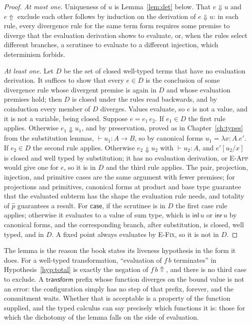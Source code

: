 \documentclass[11pt,openany]{book}
\theoremstyle{remark}
\begin{document}
\begin{proof}
\emph{At most one.} Uniqueness of $u$ is Lemma~\ref{lem:det} below. That
$e\Downarrow u$ and $e\Uparrow$ exclude each other follows by induction on
the derivation of $e\Downarrow u$: in each rule, every divergence rule for
the same term form requires some premise to diverge that the evaluation
derivation shows to evaluate, or, when the rules select different
branches, a scrutinee to evaluate to a different injection, which
determinism forbids.

\emph{At least one.} Let $D$ be the set of closed well-typed terms that
have no evaluation derivation. It suffices to show that every $e\in D$ is
the conclusion of some divergence rule whose divergent premise is again in
$D$ and whose evaluation premises hold; then $D$ is closed under the rules
read backwards, and by coinduction every member of $D$ diverges. Values
evaluate, so $e$ is not a value, and it is not a variable, being closed.
Suppose $e=e_1\,e_2$. If $e_1\in D$ the first rule applies. Otherwise
$e_1\Downarrow u_1$, and by preservation, proved as in
Chapter~\ref{ch:types} from the substitution lemmas, $\vdash u_1:A\to B$,
so by canonical forms $u_1=\lambda x{:}A.e'$. If $e_2\in D$ the second
rule applies. Otherwise $e_2\Downarrow u_2$ with $\vdash u_2:A$, and
$e'[u_2/x]$ is closed and well typed by substitution; it has no evaluation
derivation, or \textsc{E-App} would give one for $e$, so it is in $D$ and
the third rule applies. The pair, projection, injection, and primitive
cases are the same argument with fewer premises; for projections and
primitives, canonical forms at product and base type guarantee that the
evaluated subterm has the shape the evaluation rule needs, and totality of
$\hat p$ guarantees a result. For $\mathsf{case}$, if the scrutinee is in
$D$ the first case rule applies; otherwise it evaluates to a value of sum
type, which is $\mathsf{inl}\,u$ or $\mathsf{inr}\,u$ by canonical forms,
and the corresponding branch, after substitution, is closed, well typed,
and in $D$. A fixed point always evaluates by \textsc{E-Fix}, so it is not
in $D$.
\end{proof}

The lemma is the reason the book states its liveness hypothesis in the
form it does. For a well-typed transformation, ``evaluation of $f\,b$
terminates'' in Hypothesis~\ref{hyp:total} is exactly the negation of
$f\,b\Uparrow$, and there is no third case to exclude. A
$\mathsf{transform}$ prefix whose function diverges on the bound value is
not an error: the configuration simply has no step of that prefix, forever,
and the commitment waits. Whether that is acceptable is a property of the
function supplied, and the typed calculus can say precisely which
functions it is: those for which the dichotomy of the lemma falls on the
side of evaluation.
\end{document}
